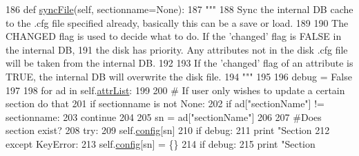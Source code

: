 \begin{DoxyCode}
186     \textcolor{keyword}{def }\hyperlink{classsoftware_1_1chipwhisperer_1_1common_1_1traces_1_1__cfgfile_1_1TraceContainerConfig_a4a724a27d4491869088867b22a18d44a}{syncFile}(self, sectionname=None):
187         \textcolor{stringliteral}{"""}
188 \textcolor{stringliteral}{        Sync the internal DB cache to the .cfg file specified already, basically this can be a save or
       load.}
189 \textcolor{stringliteral}{        }
190 \textcolor{stringliteral}{        The CHANGED flag is used to decide what to do. If the 'changed' flag is FALSE in the internal DB,}
191 \textcolor{stringliteral}{        the disk has priority. Any attributes not in the disk .cfg file will be taken from the internal DB.}
192 \textcolor{stringliteral}{        }
193 \textcolor{stringliteral}{        If the 'changed' flag of an attribute is TRUE, the internal DB will overwrite the disk file.}
194 \textcolor{stringliteral}{        """}
195          
196         debug = \textcolor{keyword}{False}
197 
198         \textcolor{keywordflow}{for} ad \textcolor{keywordflow}{in} self.\hyperlink{classsoftware_1_1chipwhisperer_1_1common_1_1traces_1_1__cfgfile_1_1TraceContainerConfig_a50e6444b02d5847a6afbb976b45a200b}{attrList}:
199 
200             \textcolor{comment}{# If user only wishes to update a certain section do that}
201             \textcolor{keywordflow}{if} sectionname \textcolor{keywordflow}{is} \textcolor{keywordflow}{not} \textcolor{keywordtype}{None}:
202                 \textcolor{keywordflow}{if} ad[\textcolor{stringliteral}{"sectionName"}] != sectionname:
203                     \textcolor{keywordflow}{continue}
204 
205             sn = ad[\textcolor{stringliteral}{"sectionName"}]
206             
207             \textcolor{comment}{#Does section exist?}
208             \textcolor{keywordflow}{try}:
209                 self.\hyperlink{classsoftware_1_1chipwhisperer_1_1common_1_1traces_1_1__cfgfile_1_1TraceContainerConfig_ac56f6f65211948add4b2fa9192e44f41}{config}[sn]
210                 \textcolor{keywordflow}{if} debug:
211                     \textcolor{keywordflow}{print} \textcolor{stringliteral}{"Section %
212             \textcolor{keywordflow}{except} KeyError:
213                 self.\hyperlink{classsoftware_1_1chipwhisperer_1_1common_1_1traces_1_1__cfgfile_1_1TraceContainerConfig_ac56f6f65211948add4b2fa9192e44f41}{config}[sn] = \{\}
214                 \textcolor{keywordflow}{if} debug:
215                     \textcolor{keywordflow}{print} \textcolor{stringliteral}{"Section %
}}
\end{DoxyCode}
